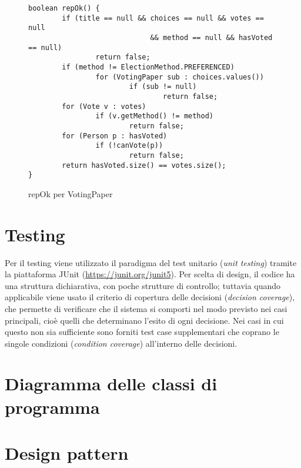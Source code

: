 \begin{figure}
	\centering
	\begin{verbatim}
boolean repOk() {
        if (title == null && choices == null && votes == null
                             && method == null && hasVoted == null)
                return false;
        if (method != ElectionMethod.PREFERENCED)
                for (VotingPaper sub : choices.values())
                        if (sub != null)
                                return false;
        for (Vote v : votes)
                if (v.getMethod() != method)
                        return false;
        for (Person p : hasVoted)
                if (!canVote(p))
                        return false;
        return hasVoted.size() == votes.size();
}
        \end{verbatim}
	\caption{repOk per VotingPaper}\label{repOk-VP}
\end{figure}




\section{Testing}\label{testing}
Per il testing viene utilizzato il paradigma del test unitario (\emph{unit testing}) tramite la piattaforma JUnit (\url{https://junit.org/junit5}). Per scelta di design, il codice ha una struttura dichiarativa, con poche strutture di controllo; tuttavia quando applicabile viene usato il criterio di copertura delle decisioni (\emph{decision coverage}), che permette di verificare che il sistema si comporti nel modo previsto nei casi principali, cioè quelli che determinano l'esito di ogni decisione. Nei casi in cui questo non sia sufficiente sono forniti test case supplementari che coprano le singole condizioni (\emph{condition coverage}) all'interno delle decisioni.




\section{Diagramma delle classi di programma}\label{implclassi}




\section{Design pattern}\label{pattern}


